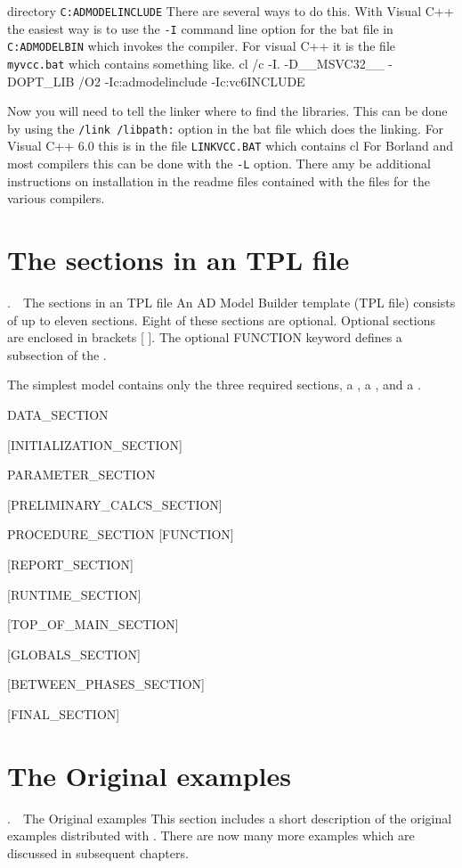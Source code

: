 \documentclass[12pt]{book}
\makeatletter
\def\mysection#1{\section{#1}{\bigbf \medbreak\noindent\number\c@chapter.\number\c@section\ \ #1\medbreak}}
\makeatother
\begin{document}
\begin{list}{}{}
directory {\tt C:\mybackslash ADMODEL\mybackslash INCLUDE}
There are several ways to do this. With Visual C++ 
the easiest way is to use the {\tt -I} command line option
for the bat file in
{\tt C:\mybackslash ADMODEL\mybackslash BIN}
which invokes the compiler. For visual C++ it is the file {\tt myvcc.bat}
which contains something like.
\beginexample
cl /c -I. -D__MSVC32__ -DOPT_LIB /O2 -Ic:\mybackslash admodel\mybackslash include -Ic:\mybackslash vc6\mybackslash INCLUDE %
\endexample
\item Now you will need to tell the linker where to find the \ADMS libraries.
This can be done by using the {\tt /link /libpath:} option in the bat file which does
the linking. For Visual C++ 6.0 this is in the file {\tt LINKVCC.BAT}
which contains
\beginexample
cl %
\endexample
For Borland and most compilers this can be done with the {\tt -L}
option. There amy be additional instructions on installation in the
readme files contained with the \ADMS files for the various compilers.
\end{list}

\mysection{The sections in an \ADMS TPL file}
An AD Model Builder template (TPL file) consists of up to eleven sections.
Eight of these sections are optional. Optional sections are 
enclosed in brackets [ ]. The optional FUNCTION keyword defines a 
subsection  of the \PROS.

\noindent The simplest model contains only the three required sections,
a \DS, a \PS, and a \PROS. 

{\parindent=0pt
\beginexample
  DATA\_SECTION
  
  [INITIALIZATION\_SECTION]
  
  PARAMETER\_SECTION

  [PRELIMINARY\_CALCS\_SECTION]

  PROCEDURE\_SECTION
    [FUNCTION]
  
  [REPORT\_SECTION]

  [RUNTIME_SECTION]

  [TOP_OF_MAIN_SECTION]

  [GLOBALS\_SECTION]

  [BETWEEN\_PHASES\_SECTION]

  [FINAL\_SECTION]
\endexample
 }


\mysection{The Original \ADMS examples}
This section includes a short description of the original
examples distributed with \ADM. There are now many more examples
which are discussed in subsequent chapters.
\end{document}
